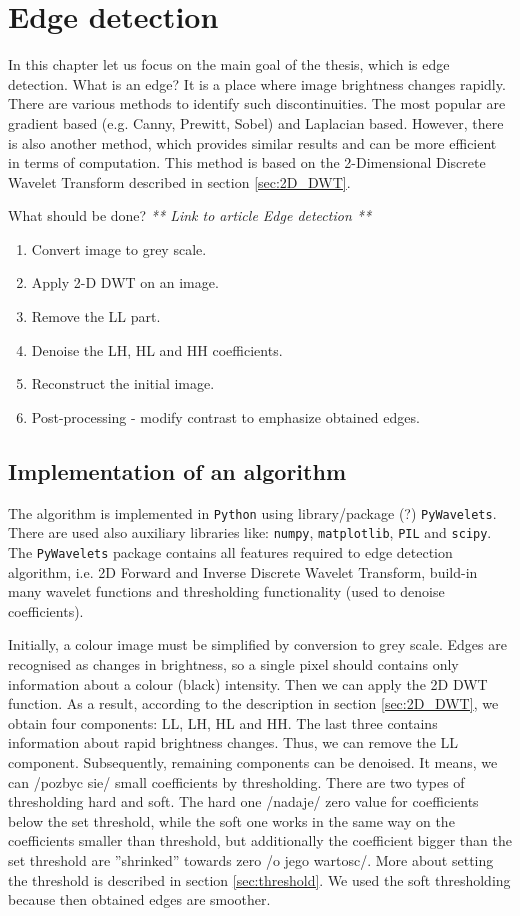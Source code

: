 \chapter{Edge detection}

In this chapter let us focus on the main goal of the thesis, which is edge detection. What is an edge? It is a place where image brightness changes rapidly. There are various methods to identify such discontinuities. The most popular are gradient based (e.g. Canny, Prewitt, Sobel) and Laplacian based. However, there is also another method, which provides similar results and can be more efficient in terms of computation. This method is based on the 2-Dimensional Discrete Wavelet Transform described in section \ref{sec:2D_DWT}. \newline

What should be done? \textit{** Link to article Edge detection **}
\begin{enumerate}
\item Convert image to grey scale.
\item Apply 2-D DWT on an image.
\item Remove the LL part.
\item Denoise the LH, HL and HH coefficients.
\item Reconstruct the initial image.
\item Post-processing - modify contrast to emphasize obtained edges.
\end{enumerate}

\section{Implementation of an algorithm}

The algorithm is implemented in \texttt{Python} using library/package (?) \texttt{PyWavelets}. There are used also auxiliary libraries like: \texttt{numpy}, \texttt{matplotlib}, \texttt{PIL} and \texttt{scipy}. The \texttt{PyWavelets} package contains all features required to edge detection algorithm, i.e. 2D Forward and Inverse Discrete Wavelet Transform, build-in many wavelet functions and thresholding functionality (used to denoise coefficients).

Initially, a colour image must be simplified by conversion to grey scale. Edges are recognised as changes in brightness, so a single pixel should contains only information about a colour (black) intensity. Then we can apply the 2D DWT function. As a result, according to the description in section \ref{sec:2D_DWT}, we obtain four components: LL, LH, HL and HH. The last three contains information about rapid brightness changes. Thus, we can remove the LL component. Subsequently, remaining components can be denoised. It means, we can /pozbyc sie/ small coefficients by thresholding. There are two types of thresholding hard and soft. The hard one /nadaje/ zero value for coefficients below the set threshold, while the soft one works in the same way on the coefficients smaller than threshold, but additionally the coefficient bigger than the set threshold are ''shrinked'' towards zero /o jego wartosc/. More about setting the threshold is described in section \ref{sec:threshold}. We used the soft thresholding because then obtained edges are smoother.

